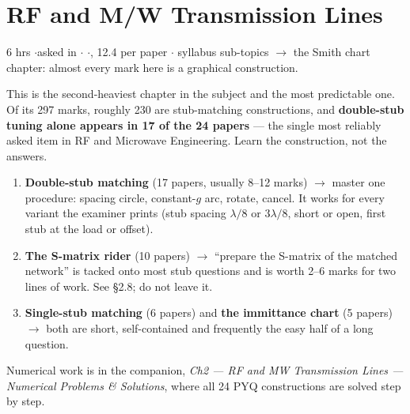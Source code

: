 \section{RF and M/W Transmission Lines}
{\color{sub}\footnotesize 6 hrs \gap$\cdot$\gap asked in 
\gap$\cdot$\gap {} \gap$\cdot$\gap {}, 12.4 per paper \gap$\cdot$ syllabus sub-topics
$\rightarrow$ the Smith chart chapter: almost every mark here is a graphical construction.}

\vspace{3pt}\noindent
\colorbox{gdL}{\makebox[\dimexpr\textwidth-2\fboxsep][l]{%
  \textcolor{gd}{\bfseries\footnotesize READ THIS FIRST}}}
\par\nobreak\vspace{3pt}

This is the second-heaviest chapter in the subject and the most predictable one.
Of its 297 marks, roughly 230 are stub-matching constructions, and
\textbf{double-stub tuning alone appears in 17 of the 24 papers} --- the single most
reliably asked item in RF and Microwave Engineering. Learn the construction, not the answers.
\begin{enumerate}[label=\arabic*., leftmargin=1.4em, itemsep=1pt]
  \item \textbf{Double-stub matching} (17 papers, usually 8--12 marks) $\rightarrow$ master
    one procedure: spacing circle, constant-$g$ arc, rotate, cancel. It works for every
    variant the examiner prints (stub spacing $\lambda/8$ or $3\lambda/8$, short or open,
    first stub at the load or offset).
  \item \textbf{The S-matrix rider} (10 papers) $\rightarrow$ ``prepare the S-matrix of the
    matched network'' is tacked onto most stub questions and is worth 2--6 marks for two
    lines of work. See \S2.8; do not leave it.
  \item \textbf{Single-stub matching} (6 papers) and \textbf{the immittance chart}
    (5 papers) $\rightarrow$ both are short, self-contained and frequently the easy half of
    a long question.
\end{enumerate}
Numerical work is in the companion, \textit{Ch2 --- RF and MW Transmission Lines ---
Numerical Problems \& Solutions}, where all 24 PYQ constructions are solved step by step.

\hr


